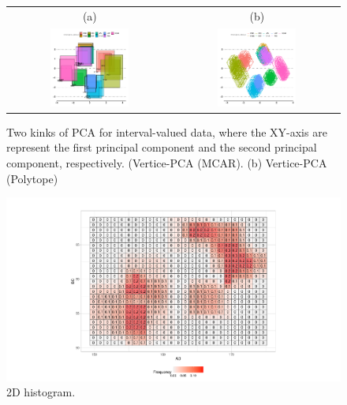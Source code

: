 \documentclass[article]{jss}
\begin{document}
\begin{appendix}
\begin{figure}[t!]
\begin{center}
\begin{tabular}{cc}
(a) & (b) \\
\includegraphics[width=0.5\textwidth]{pic/PCA_MCAR} &
\includegraphics[width=0.5\textwidth]{pic/PCA_Polytope}
\end{tabular}
\caption{\label{fig:PCA} Two kinks of PCA for interval-valued data, where the XY-axis are represent the first principal component and the second principal component, respectively.
(Vertice-PCA (MCAR). (b) Vertice-PCA (Polytope)}
\end{center}
\end{figure}



\begin{figure}[t!]
\centering
\includegraphics[width=1\textwidth]{pic/2Dhist}
\caption{\label{fig:2Dhist} 2D histogram.}
\end{figure}




\end{appendix}
\end{document}
